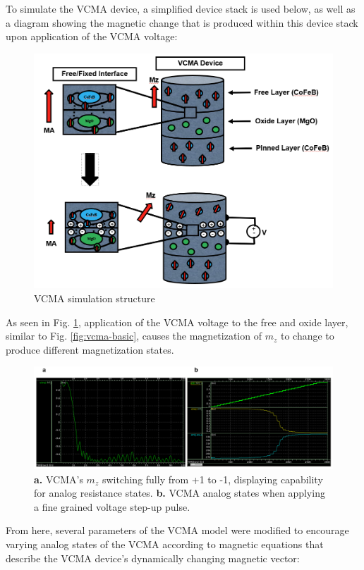 \documentclass[conference]{IEEEtran}
\begin{document}
To simulate the VCMA device, a simplified device stack is used below, as well as a diagram showing the magnetic change that is produced within this device stack upon application of the VCMA voltage:

\begin{figure}
    \centering
    \includegraphics[width=1.0\linewidth]{VCMA_diagram.png}
    \caption{VCMA simulation structure}
    \label{fig:vcma-sim}
\end{figure}

As seen in Fig. \ref{fig:vcma-sim}, application of the VCMA voltage to the free and oxide layer, similar to Fig. \ref{fig:vcma-basic}, causes the magnetization of $m_z$ to change to produce different magnetization states.

\begin{figure}
    \centering
    \includegraphics[width=1\linewidth]{Screenshot 2024-12-10 220623.png}
    \caption{\textbf{a.} VCMA's $m_z$ switching fully from +1 to -1, displaying capability for analog resistance states. \textbf{b.} VCMA analog states when applying a fine grained voltage step-up pulse.}
    \label{fig:vcma-2}
\end{figure}
From here, several parameters of the VCMA model were modified to encourage varying analog states of the VCMA according to magnetic equations that describe the VCMA device's dynamically changing magnetic vector:
\end{document}
